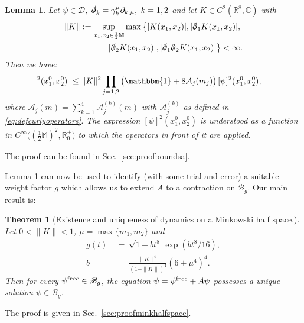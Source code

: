 \documentclass[b5paper,draft,openbib,12pt]{memoir}
\newtheorem{Thm}[Def]{Theorem}
\newtheorem{Lemma}[Def]{Lemma}
\newcommand{\R}{\mathbb{R}}
\newcommand{\CC}{\mathbb{C}}
\newcommand{\M}{\mathbb{M}}
\newcommand{\id}{\mathbbm{1}}
\newcommand{\free}{{\textup free}}
\newcommand{\Banach}{\mathscr{B}}
\begin{document}
\begin{Lemma} \label{thm:boundsa} 
	Let $\psi \in \mathscr{D}$, $\slashed{\partial}_k = \gamma_k^\mu \partial_{k,\mu},~k=1,2$ and let $K \in C^2(\R^{8},\CC)$ with
	\begin{align}
    \| K \| := \sup_{x_1, x_2 \in \frac{1}{2}\M } \max \left\{ |K(x_1,x_2)|, |\slashed{\partial}_1 K(x_1,x_2)|,\right.\\
    \left. |\slashed{\partial}_2 K(x_1,x_2)|, |\slashed{\partial}_1 \slashed{\partial}_2 K(x_1,x_2)|\right\} < \infty.
	\label{eq:normk}
  \end{align}
Then we have:
\begin{align}
		[ A \psi]^2(x_1^0,x_2^0)  ~\leq ~& \|K\|^2 \prod_{j=1,2} \big( \id + 8\mathcal{A}_j(m_j) \big) \, [\psi]^2(x_1^0,x_2^0),
\label{eq:spatialnormapsi}
\end{align}
where $\mathcal{A}_j(m) = \sum_{k=1}^4\mathcal{A}_j^{(k)}(m)$ with 
$\mathcal{A}_j^{(k)}$ as defined in \eqref{eq:defcurlyoperators}. 
The expression $[\psi ]^2(x_1^0,x_2^0)$ is understood as a function in 
$C^\infty\big( (\tfrac{1}{2}\M)^2,\mathbb{R}^+_0\big)$ to which the operators in 
front of it are applied.
\end{Lemma}

The proof can be found in Sec.\ \ref{sec:proofboundsa}.

Lemma \ref{thm:boundsa} can now be used to identify (with some trial and error) a suitable weight factor $g$ which allows us to extend $A$ to a contraction on $\Banach_g$. Our main result is:

\begin{Thm}[Existence and uniqueness of dynamics on a Minkowski half space.] \label{thm:minkhalfspace}
	Let $0 < \| K \| < 1$, $\mu = \max \{ m_1,m_2\}$ and
	\begin{align} 
		g(t)& ~=~ \sqrt{1+b t^8}\, \exp(b t^8/16),	\label{eq:defg}\\
    		b& ~=~ \frac{\|K\|^4}{(1-\|K\|)^4} \left(6+\mu^4\right)^4. \label{eq:defb}
\end{align}
	Then for every $\psi^\free \in \Banach_g$, the equation $\psi = \psi^\free + A \psi$ possesses a unique solution $\psi \in \Banach_g$.
\end{Thm}

The proof is given in Sec.\ \ref{sec:proofminkhalfspace}.
\end{document}
